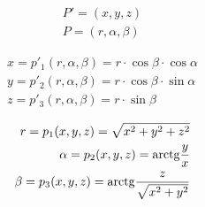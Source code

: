 \begin{equation}
\begin{split}
P' = (x, y, z) \\
P = (r, \alpha, \beta)
\end{split}
\end{equation}

\begin{equation}
\begin{split}
x = p'_1(r, \alpha, \beta) = r \cdot \cos \beta \cdot \cos \alpha \\
y = p'_2(r, \alpha, \beta) = r \cdot \cos \beta \cdot \sin \alpha \\
z = p'_3(r, \alpha, \beta) = r \cdot \sin \beta
\end{split}
\end{equation}

\begin{equation}
\begin{split}
r = p_1(x, y, z) = \sqrt{x^2 + y^2 + z^2} \\
\alpha = p_2(x, y, z) = \mathrm{arctg} \frac{y}{x} \\
\beta = p_3(x, y, z) = \mathrm{arctg} \frac{z}{\sqrt{x^2 + y^2}}
\end{split}
\end{equation}
